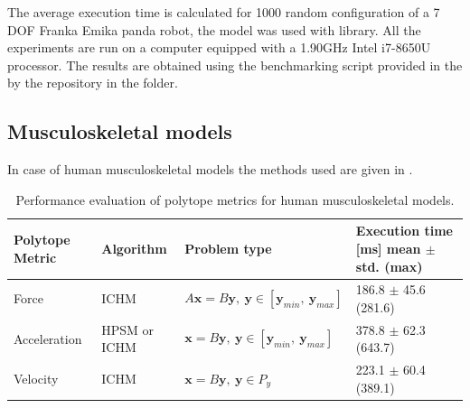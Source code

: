 
The average execution time is calculated for 1000 random configuration of a 7 DOF Franka Emika panda robot, the model was used with  \cite{pinocchio2021} library. All the experiments are run on a computer equipped with a 1.90GHz Intel i7-8650U processor. The results are obtained using the benchmarking script provided in the by the repository in the  folder. 

\subsection{Musculoskeletal models}

In case of human musculoskeletal models the methods used are given in .
\begin{table}[h]
\centering
\begin{tabular}{|l|l|l|l|}
\hline
Polytope Metric & Algorithm & Problem type & \makecell[c]{Execution time [ms] \\ mean $\pm$ std. (max)} \\
\hline
Force & ICHM & $A\bm{x}=B\bm{y},~ \bm{y} \in [\bm{y}_{min}, ~\bm{y}_{max}]$ & 186.8 $\pm$ 45.6 (281.6) \\
Acceleration & HPSM or ICHM & $\bm{x}=B\bm{y},~ \bm{y} \in [\bm{y}_{min}, ~\bm{y}_{max}]$ & 378.8 $\pm$ 62.3 (643.7) \\
Velocity & ICHM & $\bm{x}=B\bm{y},~ \bm{y} \in P_{y}$ & 223.1 $\pm$ 60.4 (389.1) \\
\hline
\end{tabular}
\caption{Performance evaluation of polytope metrics for human musculoskeletal models.}
\label{tab:methods_humans}
\end{table}

